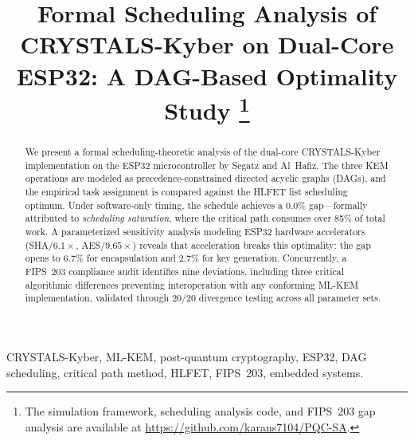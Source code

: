 \documentclass[conference]{IEEEtran}
\begin{document}
\title{Formal Scheduling Analysis of CRYSTALS-Kyber on Dual-Core ESP32: A DAG-Based Optimality Study
\thanks{The simulation framework, scheduling analysis code, and FIPS~203 gap analysis are available at \url{https://github.com/karans7104/PQC-SA}.}
}

\author{
\and
{}
\and
{}
}

\maketitle

\begin{abstract}
We present a formal scheduling-theoretic analysis of the dual-core CRYSTALS-Kyber implementation on the ESP32 microcontroller by Segatz and Al~Hafiz. The three KEM operations are modeled as precedence-constrained directed acyclic graphs (DAGs), and the empirical task assignment is compared against the HLFET list scheduling optimum. Under software-only timing, the schedule achieves a 0.0\% gap---formally attributed to \emph{scheduling saturation}, where the critical path consumes over 85\% of total work. A parameterized sensitivity analysis modeling ESP32 hardware accelerators (SHA/$6.1\times$, AES/$9.65\times$) reveals that acceleration breaks this optimality: the gap opens to 6.7\% for encapsulation and 2.7\% for key generation. Concurrently, a FIPS~203 compliance audit identifies nine deviations, including three critical algorithmic differences preventing interoperation with any conforming ML-KEM implementation, validated through 20/20 divergence testing across all parameter sets.
\end{abstract}

\begin{IEEEkeywords}
CRYSTALS-Kyber, ML-KEM, post-quantum cryptography, ESP32, DAG scheduling, critical path method, HLFET, FIPS~203, embedded systems.
\end{IEEEkeywords}
\end{document}
